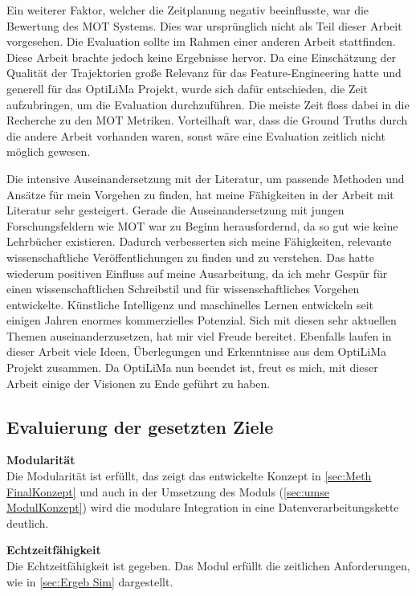 Ein weiterer Faktor, welcher die Zeitplanung negativ beeinflusste, war die Bewertung des MOT Systems. Dies war ursprünglich nicht als Teil dieser Arbeit vorgesehen. Die Evaluation sollte im Rahmen einer anderen Arbeit stattfinden. Diese Arbeit brachte jedoch keine Ergebnisse hervor. Da eine Einschätzung der Qualität der Trajektorien große Relevanz für das Feature-Engineering hatte und generell für das \acrshort{OptiLiMa} Projekt, wurde sich dafür entschieden, die Zeit aufzubringen, um die Evaluation durchzuführen. Die meiste Zeit floss dabei in die Recherche zu den MOT Metriken. Vorteilhaft war, dass die Ground Truths durch die andere Arbeit vorhanden waren, sonst wäre eine Evaluation zeitlich nicht möglich gewesen.\par

Die intensive Auseinandersetzung mit der Literatur, um passende Methoden und Ansätze für mein Vorgehen zu finden, hat meine Fähigkeiten in der Arbeit mit Literatur sehr gesteigert. Gerade die Auseinandersetzung mit jungen Forschungsfeldern wie MOT war zu Beginn herausfordernd, da so gut wie keine Lehrbücher existieren. Dadurch verbesserten sich meine Fähigkeiten, relevante wissenschaftliche Veröffentlichungen zu finden und zu verstehen. Das hatte wiederum positiven Einfluss auf meine Ausarbeitung, da ich mehr Gespür für einen wissenschaftlichen Schreibstil und für wissenschaftliches Vorgehen entwickelte. Künstliche Intelligenz und maschinelles Lernen entwickeln seit einigen Jahren enormes kommerzielles Potenzial. Sich mit diesen sehr aktuellen Themen auseinanderzusetzen, hat mir viel Freude bereitet. Ebenfalls laufen in dieser Arbeit viele Ideen, Überlegungen und Erkenntnisse aus dem \acrshort{OptiLiMa} Projekt zusammen. Da \acrshort{OptiLiMa} nun beendet ist, freut es mich, mit dieser Arbeit einige der Visionen zu Ende geführt zu haben.\par


\subsection{Evaluierung der gesetzten Ziele}

\textbf{Modularität}\\
Die Modularität ist erfüllt, das zeigt das entwickelte Konzept in \autoref{sec:Meth FinalKonzept} und auch in der Umsetzung des Moduls (\autoref{sec:umse ModulKonzept})  wird die modulare Integration in eine Datenverarbeitungskette deutlich. \par

\textbf{Echtzeitfähigkeit}\\
Die Echtzeitfähigkeit ist gegeben. Das Modul erfüllt die zeitlichen Anforderungen, wie in \autoref{sec:Ergeb Sim} dargestellt.\par

